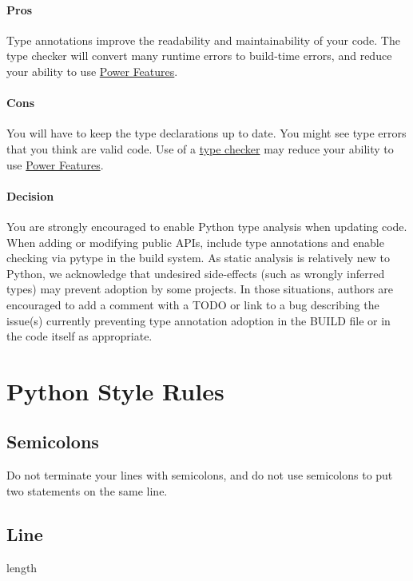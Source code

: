 \documentclass[
]{article}
\begin{document}
\paragraph{Pros}

Type annotations improve the readability and maintainability of your
code. The type checker will convert many runtime errors to build-time
errors, and reduce your ability to use \hyperref[power-features]{Power
Features}.

\paragraph{Cons}

You will have to keep the type declarations up to date. You might see
type errors that you think are valid code. Use of a
\href{https://github.com/google/pytype}{type checker} may reduce your
ability to use \hyperref[power-features]{Power Features}.

\paragraph{Decision}

You are strongly encouraged to enable Python type analysis when updating
code. When adding or modifying public APIs, include type annotations and
enable checking via pytype in the build system. As static analysis is
relatively new to Python, we acknowledge that undesired side-effects
(such as wrongly inferred types) may prevent adoption by some projects.
In those situations, authors are encouraged to add a comment with a TODO
or link to a bug describing the issue(s) currently preventing type
annotation adoption in the BUILD file or in the code itself as
appropriate.

\section{Python Style Rules}

\subsection{Semicolons}

Do not terminate your lines with semicolons, and do not use semicolons
to put two statements on the same line.

\subsection{Line} length
\end{document}
